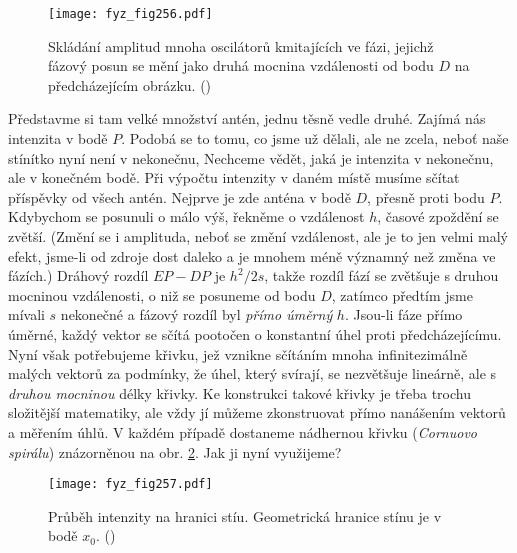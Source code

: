     \begin{figure}[ht!] %
      \centering
      \texttt{[image: fyz\_fig256.pdf]}
      \caption{Skládání amplitud mnoha oscilátorů kmitajících ve fázi, jejichž fázový posun se mění 
              jako druhá mocnina vzdálenosti od bodu \(D\) na předcházejícím obrázku.
               (\cite[s.~389]{Feynman01})}
      \label{fyz:fig256}
    \end{figure}
    
    Představme si tam velké množství antén, jednu těsně vedle druhé. Zajímá nás intenzita v bodě 
    \(P\). Podobá se to tomu, co jsme už dělali, ale ne zcela, neboť naše stínítko nyní není v 
    nekonečnu, Nechceme vědět, jaká je intenzita v nekonečnu, ale v konečném bodě. Při výpočtu 
    intenzity v daném místě musíme sčítat příspěvky od všech antén. Nejprve je zde anténa v bodě 
    \(D\), přesně proti bodu \(P\). Kdybychom se posunuli o málo výš, řekněme o vzdálenost \(h\), 
    časové zpoždění se zvětší. (Změní se i amplituda, neboť se změní vzdálenost, ale je to jen 
    velmi malý efekt, jsme-li od zdroje dost daleko a je mnohem méně významný než změna ve fázích.) 
    Dráhový rozdíl \(EP - DP\) je \(h^2/2s\), takže rozdíl fází se zvětšuje s druhou mocninou 
    vzdálenosti, o niž se posuneme od bodu \(D\), zatímco předtím jsme mívali \(s\) nekonečné a 
    fázový rozdíl byl \emph{přímo úměrný} \(h\). Jsou-li fáze přímo úměrné, každý vektor se sčítá 
    pootočen o konstantní úhel proti předcházejícímu. Nyní však potřebujeme křivku, jež vznikne 
    sčítáním mnoha infinitezimálně malých vektorů za podmínky, že úhel, který svírají, se 
    nezvětšuje lineárně, ale s \emph{druhou mocninou} délky křivky. Ke konstrukci takové křivky je 
    třeba trochu složitější matematiky, ale vždy jí můžeme zkonstruovat přímo nanášením vektorů a 
    měřením úhlů. V každém případě dostaneme nádhernou křivku (\emph{Cornuovo spirálu}) znázorněnou 
    na obr. \ref{fyz:fig257}. Jak ji nyní využijeme?

    \begin{figure}[ht!] %
      \centering
      \texttt{[image: fyz\_fig257.pdf]}
      \caption{Průběh intenzity na hranici stíu. Geometrická hranice stínu je v bodě \(x_0\).
               (\cite[s.~403]{Feynman01})}
      \label{fyz:fig257}
    \end{figure}

